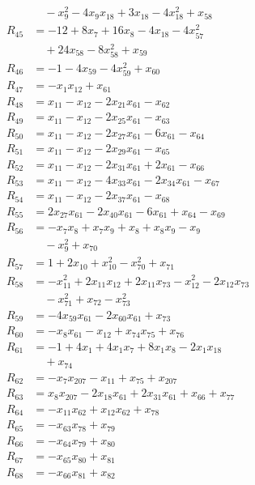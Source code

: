 \begin{align*}
&\quad -x_{9}^{2} -4x_{9}x_{18} +3x_{18} -4x_{18}^{2} +x_{58}\\
R_{45} &= -12 +8x_{7} +16x_{8} -4x_{18} -4x_{57}^{2}\\
&\quad +24x_{58} -8x_{58}^{2} +x_{59}\\
R_{46} &= -1 -4x_{59} -4x_{59}^{2} +x_{60}\\
R_{47} &= -x_{1}x_{12} +x_{61}\\
R_{48} &= x_{11} -x_{12} -2x_{21}x_{61} -x_{62}\\
R_{49} &= x_{11} -x_{12} -2x_{25}x_{61} -x_{63}\\
R_{50} &= x_{11} -x_{12} -2x_{27}x_{61} -6x_{61} -x_{64}\\
R_{51} &= x_{11} -x_{12} -2x_{29}x_{61} -x_{65}\\
R_{52} &= x_{11} -x_{12} -2x_{31}x_{61} +2x_{61} -x_{66}\\
R_{53} &= x_{11} -x_{12} -4x_{33}x_{61} -2x_{34}x_{61} -x_{67}\\
R_{54} &= x_{11} -x_{12} -2x_{37}x_{61} -x_{68}\\
R_{55} &= 2x_{27}x_{61} -2x_{40}x_{61} -6x_{61} +x_{64} -x_{69}\\
R_{56} &= -x_{7}x_{8} +x_{7}x_{9} +x_{8} +x_{8}x_{9} -x_{9}\\
&\quad -x_{9}^{2} +x_{70}\\
R_{57} &= 1 +2x_{10} +x_{10}^{2} -x_{70}^{2} +x_{71}\\
R_{58} &= -x_{11}^{2} +2x_{11}x_{12} +2x_{11}x_{73} -x_{12}^{2} -2x_{12}x_{73}\\
&\quad -x_{71}^{2} +x_{72} -x_{73}^{2}\\
R_{59} &= -4x_{59}x_{61} -2x_{60}x_{61} +x_{73}\\
R_{60} &= -x_{8}x_{61} -x_{12} +x_{74}x_{75} +x_{76}\\
R_{61} &= -1 +4x_{1} +4x_{1}x_{7} +8x_{1}x_{8} -2x_{1}x_{18}\\
&\quad +x_{74}\\
R_{62} &= -x_{7}x_{207} -x_{11} +x_{75} +x_{207}\\
R_{63} &= x_{8}x_{207} -2x_{18}x_{61} +2x_{31}x_{61} +x_{66} +x_{77}\\
R_{64} &= -x_{11}x_{62} +x_{12}x_{62} +x_{78}\\
R_{65} &= -x_{63}x_{78} +x_{79}\\
R_{66} &= -x_{64}x_{79} +x_{80}\\
R_{67} &= -x_{65}x_{80} +x_{81}\\
R_{68} &= -x_{66}x_{81} +x_{82}\\

\end{align*}
